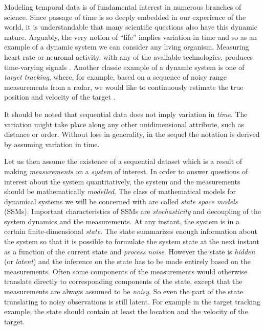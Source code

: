 Modeling temporal data is of fundamental interest in numerous branches of science.
Since passage of time is so deeply embedded in our experience of the world, 
it is understandable that many scientific questions also have this dynamic nature.
Arguably, the very notion of ``life'' implies variation in time and so 
as an example of a dynamic system we can consider any living organism.
Measuring heart rate or neuronal activity, with any of the available technologies,
produces time-varying signals \parencite{Barbieri2006,Ergun2007}. Another classic example of a dynamic system is
one of \emph{target tracking}, where, for example, based on a sequence of 
noisy range measurements from a radar, we would like to continuously 
estimate the true position and velocity of the target \parencite{bar2004estimation,Godsill2007}. 

It should be noted that sequential data does not imply variation in \emph{time}.
The variation might take place along any other unidimensional attribute,
such as distance or order. Without loss in generality, in the sequel the notation 
is derived by assuming variation in time. 

Let us then assume the existence of a sequential dataset which is a result of 
making \emph{measurements} on a \emph{system} of interest. In order to answer questions of interest
about the system quantitatively,
the system and the measurements should be mathematically \emph{modelled}. The class of mathematical
models for dynamical systems we will be concerned with are called \emph{state space models} (SSMs).
Important characteristics of SSMs are \emph{stochasticity} and decoupling of the system dynamics and the
measurements. At any instant, the system is in a certain finite-dimensional \emph{state}. The state
summarizes enough information about the system so that it is possible to formulate the system
state at the next instant as a function of the current state and \emph{process noise}.  
However the state is \emph{hidden} (or \emph{latent}) and the inference on the state has 
to be made entirely based on the measurements.  Often some components of the measurements 
would otherwise translate directly to corresponding components of the state, except that 
the measurements are always assumed to be \emph{noisy}. So even the part of the state translating 
to noisy observations is still latent.
For example in the target tracking example, the state should contain at least the location and 
the velocity of the target. 

